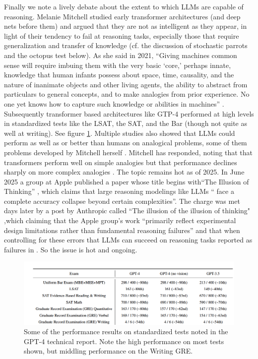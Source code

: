Finally we note a lively debate about the extent to which LLMs are capable of reasoning. Melanie Mitchell studied early transformer architectures (and deep nets before them) and argued that they are not as intelligent as they appear, in light of their tendency to fail at reasoning tasks, especially those that require generalization and transfer of knowledge (cf. the discussion of stochastic parrots and the octopus test below).  As she said in 2021, ``Giving machines common sense will require imbuing them with the very basic `core,' perhaps innate, knowledge that human infants possess about space, time, causality, and the nature of inanimate objects and other living agents, the ability to abstract from particulars to general
concepts, and to make analogies from prior experience. No one yet knows how to capture such knowledge
or abilities in machines'' \cite{mitchell2021ai}. Subsequently transformer based architectures like GTP-4 performed at high levels in standardized tests like the LSAT, the SAT, and the Bar (though not quite as well at writing). See figure \ref{llmStandardExams}. Multiple studies also showed that LLMs could perform as well as or better than humans on analogical problems, some of them problems developed by Mitchell herself \cite{webb2023emergent}.  Mitchell has responded, noting that that transformers perform well on simple analogies but that performance declines sharply  on  more complex analogies \cite{lewis2025evaluating}. The topic remains hot as of 2025. In June 2025 a group at Apple published a paper whose title begins with``The Illusion of Thinking'' \cite{shojaee2025illusion}, which claims that large reasoning modelings like LLMs `` face a complete accuracy collapse beyond certain complexities''. The charge was met days later by a post by Anthropic called ``The illusion of the illusion of thinking" \cite{opus2025illusion},which claiming that the Apple group's work ``primarily reflect experimental design limitations rather than fundamental reasoning failures'' and that when controlling for these errors that LLMs can succeed on reasoning tasks reported as failures in \cite{shojaee2025illusion}. So the issue is hot and ongoing.

\begin{figure}[h]
\centering
\includegraphics[scale=.8]{./images/llmStandardizedExams.png}
\caption[From \cite{achiam2023gpt}.]{Some of the performance results on standardized tests noted in the GPT-4 technical report.  Note the high performance on most tests shown, but middling performance on the Writing GRE. }
\label{llmStandardExams}
\end{figure}

